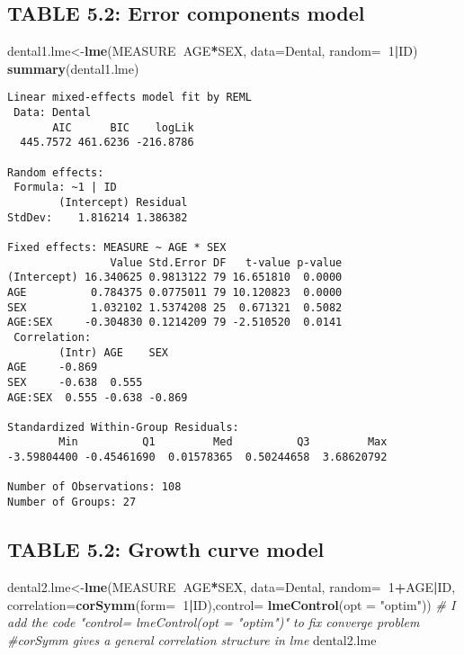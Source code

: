 \documentclass[]{book}
\newenvironment{Shaded}{\begin{snugshade}}{\end{snugshade}}
\newcommand{\CommentTok}[1]{\textcolor[rgb]{0.56,0.35,0.01}{\textit{#1}}}
\newcommand{\DataTypeTok}[1]{\textcolor[rgb]{0.13,0.29,0.53}{#1}}
\newcommand{\DecValTok}[1]{\textcolor[rgb]{0.00,0.00,0.81}{#1}}
\newcommand{\KeywordTok}[1]{\textcolor[rgb]{0.13,0.29,0.53}{\textbf{#1}}}
\newcommand{\NormalTok}[1]{#1}
\newcommand{\OperatorTok}[1]{\textcolor[rgb]{0.81,0.36,0.00}{\textbf{#1}}}
\newcommand{\StringTok}[1]{\textcolor[rgb]{0.31,0.60,0.02}{#1}}
\begin{document}
\hypertarget{table-5.2-error-components-model}{%
\subsection{TABLE 5.2: Error components model}\label{table-5.2-error-components-model}}

\begin{Shaded}
\begin{Highlighting}[]
\NormalTok{dental1.lme<-}\KeywordTok{lme}\NormalTok{(MEASURE}\OperatorTok{~}\NormalTok{AGE}\OperatorTok{*}\NormalTok{SEX, }\DataTypeTok{data=}\NormalTok{Dental, }\DataTypeTok{random=}\OperatorTok{~}\DecValTok{1}\OperatorTok{|}\NormalTok{ID)}
\KeywordTok{summary}\NormalTok{(dental1.lme)}
\end{Highlighting}
\end{Shaded}

\begin{verbatim}
Linear mixed-effects model fit by REML
 Data: Dental 
       AIC      BIC    logLik
  445.7572 461.6236 -216.8786

Random effects:
 Formula: ~1 | ID
        (Intercept) Residual
StdDev:    1.816214 1.386382

Fixed effects: MEASURE ~ AGE * SEX 
                Value Std.Error DF   t-value p-value
(Intercept) 16.340625 0.9813122 79 16.651810  0.0000
AGE          0.784375 0.0775011 79 10.120823  0.0000
SEX          1.032102 1.5374208 25  0.671321  0.5082
AGE:SEX     -0.304830 0.1214209 79 -2.510520  0.0141
 Correlation: 
        (Intr) AGE    SEX   
AGE     -0.869              
SEX     -0.638  0.555       
AGE:SEX  0.555 -0.638 -0.869

Standardized Within-Group Residuals:
        Min          Q1         Med          Q3         Max 
-3.59804400 -0.45461690  0.01578365  0.50244658  3.68620792 

Number of Observations: 108
Number of Groups: 27 
\end{verbatim}

\hypertarget{table-5.2-growth-curve-model}{%
\subsection{TABLE 5.2: Growth curve model}\label{table-5.2-growth-curve-model}}

\begin{Shaded}
\begin{Highlighting}[]
\NormalTok{dental2.lme<-}\KeywordTok{lme}\NormalTok{(MEASURE}\OperatorTok{~}\NormalTok{AGE}\OperatorTok{*}\NormalTok{SEX, }\DataTypeTok{data=}\NormalTok{Dental, }\DataTypeTok{random=}\OperatorTok{~}\DecValTok{1}\OperatorTok{+}\NormalTok{AGE}\OperatorTok{|}\NormalTok{ID, }\DataTypeTok{correlation=}\KeywordTok{corSymm}\NormalTok{(}\DataTypeTok{form=}\OperatorTok{~}\DecValTok{1}\OperatorTok{|}\NormalTok{ID),}\DataTypeTok{control=} \KeywordTok{lmeControl}\NormalTok{(}\DataTypeTok{opt =} \StringTok{"optim"}\NormalTok{)) }\CommentTok{# I add the code "control= lmeControl(opt = "optim")" to fix converge problem}
\CommentTok{#corSymm gives a general correlation structure in lme}
\NormalTok{dental2.lme}
\end{Highlighting}
\end{Shaded}
\end{document}
